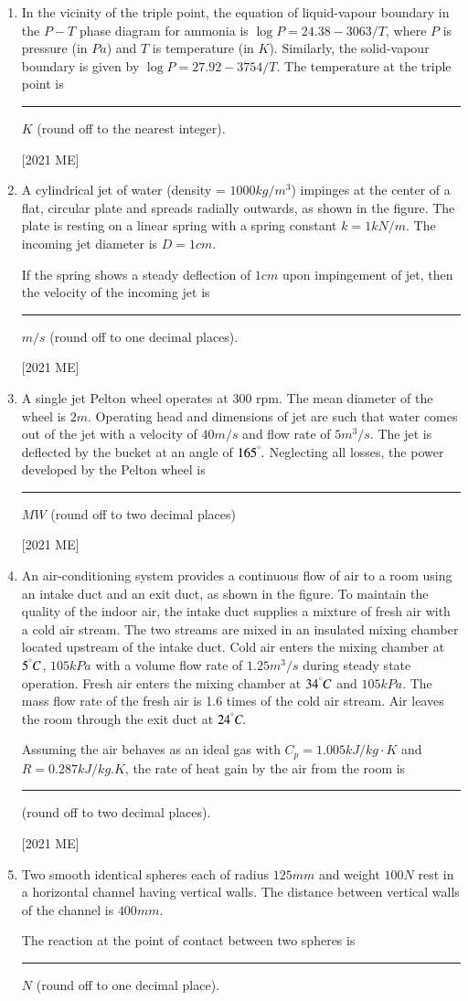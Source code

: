 \documentclass[journal]{IEEEtran}
\begin{document}
\begin{enumerate}
\hfill [2021 ME] 
\item In the vicinity of the triple point, the equation of liquid-vapour boundary
in the $P - T$ phase diagram for ammonia is $\log P = 24.38 - 3063/T$,
where $P$ is pressure (in $Pa$) and $T$ is temperature (in $K$). Similarly, the
solid-vapour boundary is given by $\log P = 27.92 - 3754/T$. The
temperature at the triple point is \rule{2cm}{0.4pt}$K$ (round off to the nearest integer).

\hfill [2021 ME]
\item A cylindrical jet of water (density = $1000 kg/m^3$) impinges at the center of a
flat, circular plate and spreads radially outwards, as shown in the figure.
The plate is resting on a linear spring with a spring constant $k = 1 kN/m.$
The incoming jet diameter is $D = 1 cm.$

If the spring shows a steady deflection of $1 cm$ upon impingement of jet,
then the velocity of the incoming jet is \rule{2cm}{0.4pt}$m/s$ (round off to one decimal places).

\hfill [2021 ME]
\item A single jet Pelton wheel operates at 300 rpm. The mean diameter of the
wheel is $2 m$. Operating head and dimensions of jet are such that water
comes out of the jet with a velocity of $40 m/s$ and flow rate of $5 m^3
/s$. The jet
is deflected by the bucket at an angle of $165^\degree.$ Neglecting all losses, the
power developed by the Pelton wheel is \rule{2cm}{0.4pt} $MW$ (round off to two decimal places)

\hfill [2021 ME]
\item An air-conditioning system provides a continuous flow of air to a room using
an intake duct and an exit duct, as shown in the figure. To maintain the
quality of the indoor air, the intake duct supplies a mixture of fresh air with
a cold air stream. The two streams are mixed in an insulated mixing chamber
located upstream of the intake duct. Cold air enters the mixing chamber at
$5 ^\degree C$, $105 kPa$ with a volume flow rate of $1.25 m^3/s$ during steady state
operation. Fresh air enters the mixing chamber at $34 ^\degree C$ and $105 kPa$. The
mass flow rate of the fresh air is 1.6 times of the cold air stream. Air leaves
the room through the exit duct at $24 ^\degree C.$

Assuming the air behaves as an ideal gas with $C_p = 1.005 kJ/kg\cdot K$ and $R = 0.287 kJ/kg.K$, the rate of heat gain by the air from the room is \rule{2cm}{0.4pt} (round off to two decimal places).

\hfill [2021 ME]
\item Two smooth identical spheres each of radius $125 mm$ and weight $100 N$ rest
in a horizontal channel having vertical walls. The distance between vertical
walls of the channel is $400 mm.$ 

The reaction at the point of contact between two spheres is \rule{2cm}{0.4pt} $N$ (round off to one decimal place).


\end{enumerate}
\end{document}

